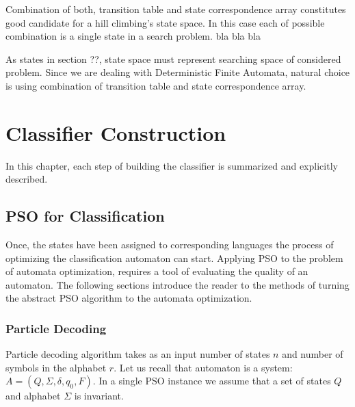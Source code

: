 \documentclass{mini}
\begin{document}
Combination of both, transition table and state correspondence array constitutes good candidate for a  hill climbing's state space. In this case each of possible combination is a single state in a search problem.  bla bla bla  

As states in section ??, state space must represent searching space of considered problem. Since we are dealing with Deterministic Finite Automata, natural choice is using combination of transition table and state correspondence array.



\chapter{Classifier Construction}\label{chap:classification}

In this chapter, each step of building the classifier is summarized and explicitly described.

\section{PSO for Classification}

Once, the states have been assigned to corresponding languages the process of optimizing the classification automaton can start. Applying PSO to the problem of automata optimization, requires a tool of evaluating the quality of an automaton. The following sections introduce the reader to the methods of turning the abstract PSO algorithm to the  automata optimization.

\subsection{Particle Decoding}


Particle decoding algorithm takes as an input number of states $n$ and number of symbols in the alphabet $r$.
Let us recall that automaton is a system: $A = (Q, \Sigma, \delta, q_0, F)$. In a single PSO instance we assume that a set of states $Q$ and alphabet $\Sigma$ is invariant. 
\end{document}
